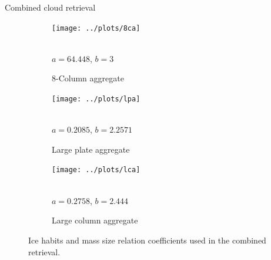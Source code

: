 \documentclass[8pt, final,hyperref={pdfpagelabels=false}]{beamer}
\begin{document}
\begin{frame}
\begin{columns}[t]
\begin{column}{.48\linewidth}
\begin{block}{Combined cloud retrieval}
           \begin{figure}
             \begin{center}
             \begin{subfigure}[t]{0.3\textwidth}
               \texttt{[image: ../plots/8ca]}
               \vspace{0.3cm}
                \begin{small} \\$a = 64.448$, $b = 3$\end{small}
               \vspace{0.3cm}
               \caption{8-Column aggregate}
             \end{subfigure}%
             \begin{subfigure}[t]{0.3\textwidth}
               \texttt{[image: ../plots/lpa]}
               \vspace{0.3cm}
                \begin{small} \\$a = 0.2085$, $b = 2.2571$\end{small}
               \vspace{0.3cm}
               \caption{Large plate aggregate}
             \end{subfigure}%
             \begin{subfigure}[t]{0.32\textwidth}
               \texttt{[image: ../plots/lca]}
               \vspace{0.3cm}
                \begin{small} \\$a = 0.2758$, $b = 2.444$\end{small}
               \vspace{0.3cm}
               \caption{Large column aggregate}
             \end{subfigure}\hfill%
             \end{center}
             \caption{Ice habits and mass size relation coefficients used in the combined
               retrieval.}
           \end{figure}

        \end{block}

    \end{column}

          

\end{columns}
\end{frame}
\end{document}
